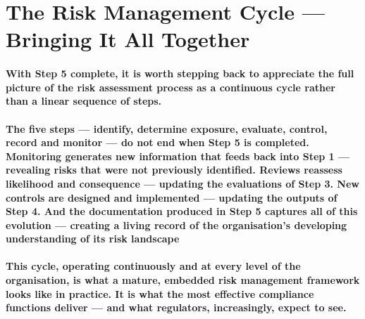 \section{The Risk Management Cycle — Bringing It All Together}
\paragraph{With Step 5 complete, it is worth stepping back to appreciate the full picture of the risk assessment process as a continuous cycle rather than a linear sequence of steps.}
\paragraph{The five steps — identify, determine exposure, evaluate, control, record and monitor — do not end when Step 5 is completed. Monitoring generates new information that feeds back into Step 1 — revealing risks that were not previously identified. Reviews reassess likelihood and consequence — updating the evaluations of Step 3. New controls are designed and implemented — updating the outputs of Step 4. And the documentation produced in Step 5 captures all of this evolution — creating a living record of the organisation's developing understanding of its risk landscape}
\paragraph{This cycle, operating continuously and at every level of the organisation, is what a mature, embedded risk management framework looks like in practice. It is what the most effective compliance functions deliver — and what regulators, increasingly, expect to see.}

\newpage
